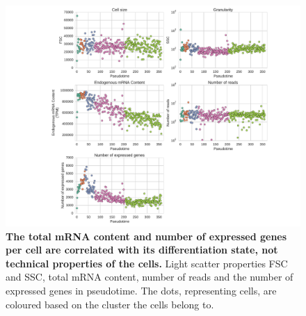 \begin{figure}
    \centering
    \includegraphics[width=\textwidth]{"SF7"}
    \caption[The total mRNA content and number of expressed genes per cell are correlated with its differentiation state, not technical properties of the cells]{\textbf{The total mRNA content and number of expressed genes per cell are correlated with its differentiation state, not technical properties of the cells.} Light scatter properties FSC and SSC, total mRNA content, number of reads and the number of expressed genes in pseudotime. The dots, representing cells, are coloured based on the cluster the cells belong to.}
    \label{fig:technical}
\end{figure}
